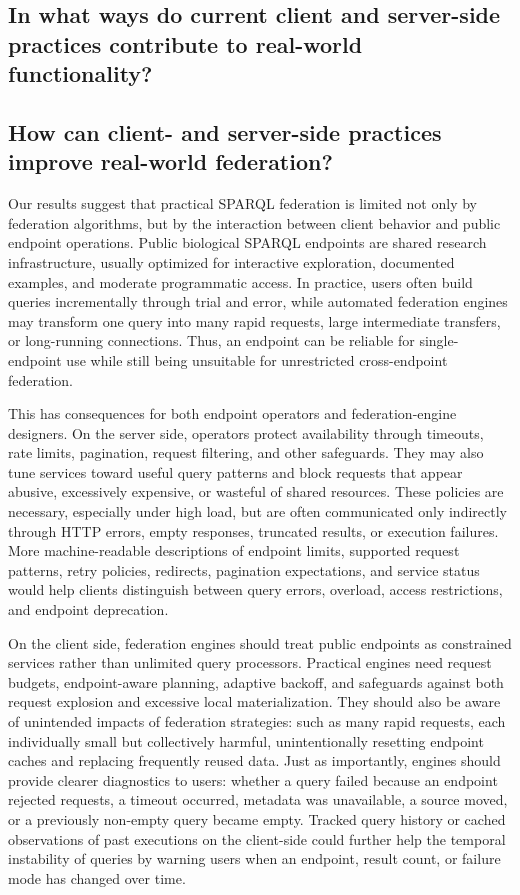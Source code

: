 \documentclass[runningheads]{llncs}
\begin{document}
\subsection{In what ways do current client and server-side practices contribute to real-world functionality?}


\subsection{How can client- and server-side practices improve real-world federation?}

Our results suggest that practical SPARQL federation is limited not only by federation algorithms, but by the interaction between client behavior and public endpoint operations. 
Public biological SPARQL endpoints are shared research infrastructure, usually optimized for interactive exploration, documented examples, and moderate programmatic access. 
In practice, users often build queries incrementally through trial and error, while automated federation engines may transform one query into many rapid requests, large intermediate transfers, or long-running connections. 
Thus, an endpoint can be reliable for single-endpoint use while still being unsuitable for unrestricted cross-endpoint federation.

This has consequences for both endpoint operators and federation-engine designers. 
On the server side, operators protect availability through timeouts, rate limits, pagination, request filtering, and other safeguards. 
They may also tune services toward useful query patterns and block requests that appear abusive, excessively expensive, or wasteful of shared resources. 
These policies are necessary, especially under high load, but are often communicated only indirectly through HTTP errors, empty responses, truncated results, or execution failures. 
More machine-readable descriptions of endpoint limits, supported request patterns, retry policies, redirects, pagination expectations, and service status would help clients distinguish between query errors, overload, access restrictions, and endpoint deprecation.

On the client side, federation engines should treat public endpoints as constrained services rather than unlimited query processors. 
Practical engines need request budgets, endpoint-aware planning, adaptive backoff, and safeguards against both request explosion and excessive local materialization. 
They should also be aware of unintended impacts of federation strategies: such as many rapid requests, each individually small but collectively harmful, unintentionally resetting endpoint caches and replacing frequently reused data. 
Just as importantly, engines should provide clearer diagnostics to users: whether a query failed because an endpoint rejected requests, a timeout occurred, metadata was unavailable, a source moved, or a previously non-empty query became empty. 
Tracked query history or cached observations of past executions on the client-side could further help the temporal instability of queries by warning users when an endpoint, result count, or failure mode has changed over time.
\end{document}
